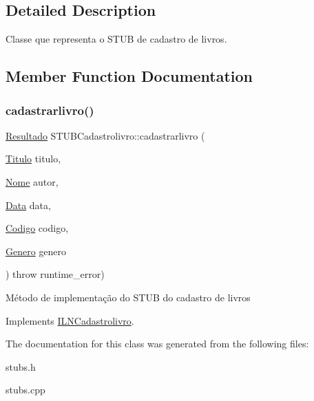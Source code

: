 \subsection{Detailed Description}
Classe que representa o S\+T\+UB de cadastro de livros. 

\subsection{Member Function Documentation}
\mbox{\label{classSTUBCadastrolivro_aadf0031014810edcaac8c456bafceb48}} 
\subsubsection{\texorpdfstring{cadastrarlivro()}{cadastrarlivro()}}
{\footnotesize\ttfamily \hyperlink{classResultado}{Resultado} S\+T\+U\+B\+Cadastrolivro\+::cadastrarlivro (\begin{DoxyParamCaption}\item[{\hyperlink{classTitulo}{Titulo}}]{titulo,  }\item[{\hyperlink{classNome}{Nome}}]{autor,  }\item[{\hyperlink{classData}{Data}}]{data,  }\item[{\hyperlink{classCodigo}{Codigo}}]{codigo,  }\item[{\hyperlink{classGenero}{Genero}}]{genero }\end{DoxyParamCaption}) throw  runtime\+\_\+error) \hspace{0.3cm}{\ttfamily [virtual]}}

Método de implementação do S\+T\+UB do cadastro de livros 

Implements \hyperlink{classILNCadastrolivro}{I\+L\+N\+Cadastrolivro}.



The documentation for this class was generated from the following files\+:\begin{DoxyCompactItemize}
\item 
stubs.\+h\item 
stubs.\+cpp\end{DoxyCompactItemize}
